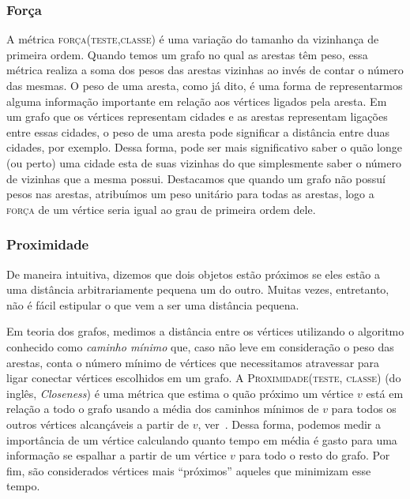 \subsubsection{Força}
\label{subsubsection::strength}

A métrica \textsc{força(teste,classe)} é uma variação do tamanho da vizinhança de primeira ordem. Quando temos um grafo no qual as arestas têm peso, essa métrica realiza a soma dos pesos das arestas vizinhas ao invés de contar o número das mesmas. O peso de uma aresta, como já dito, é uma forma de representarmos alguma informação importante em relação aos vértices ligados pela aresta. Em um grafo que os vértices representam cidades e as arestas representam ligações entre essas cidades, o peso de uma aresta pode significar a distância entre duas cidades, por exemplo. Dessa forma, pode ser mais significativo saber o quão longe (ou perto) uma cidade esta de suas vizinhas do que simplesmente saber o número de vizinhas que a mesma possui.
Destacamos que quando um grafo não possuí pesos nas arestas, atribuímos um peso unitário para todas as arestas, logo a \textsc{força} de um vértice seria igual ao grau de primeira ordem dele.

\subsubsection{Proximidade}
\label{subsubsection::closeness}

De maneira intuitiva, dizemos que dois objetos estão próximos se eles estão a uma distância arbitrariamente pequena um do outro. Muitas vezes, entretanto, não é fácil estipular o que vem a ser uma distância pequena. 

Em teoria dos grafos, medimos a distância entre os vértices utilizando o algoritmo conhecido como \textit{caminho mínimo} que, caso não leve em consideração o peso das arestas, conta o número mínimo de vértices que necessitamos atravessar para ligar conectar vértices escolhidos em um grafo. A \textsc{Proximidade(teste, classe)} (do inglês, \textit{Closeness}) é uma métrica que estima o quão próximo um vértice $v$ está em relação a todo o grafo usando a média dos caminhos mínimos de $v$ para todos os outros vértices alcançáveis a partir de $v$, ver~\cite{Beauchamp65}. Dessa forma, podemos medir a importância de um vértice calculando quanto tempo em média é gasto para uma informação se espalhar a partir de um vértice $v$ para todo o resto do grafo. Por fim, são considerados vértices mais ``próximos'' aqueles que minimizam esse tempo.

